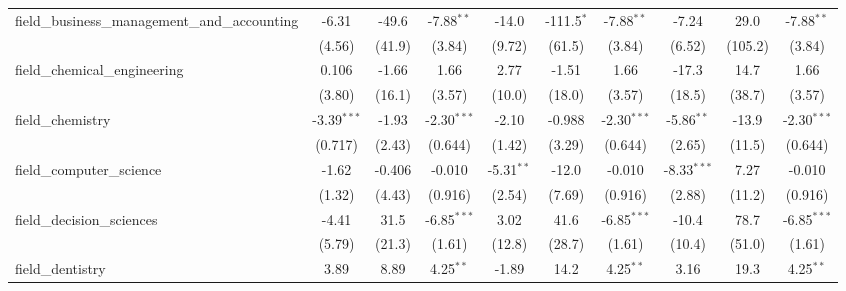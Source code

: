 \begin{tabular}{lccccccccc}
   field\_business\_management\_and\_accounting                & -6.31         & -49.6          & -7.88$^{**}$  & -14.0         & -111.5$^{*}$  & -7.88$^{**}$  & -7.24         & 29.0           & -7.88$^{**}$\\   
                                                               & (4.56)        & (41.9)         & (3.84)        & (9.72)        & (61.5)        & (3.84)        & (6.52)        & (105.2)        & (3.84)\\   
   field\_chemical\_engineering                                & 0.106         & -1.66          & 1.66          & 2.77          & -1.51         & 1.66          & -17.3         & 14.7           & 1.66\\   
                                                               & (3.80)        & (16.1)         & (3.57)        & (10.0)        & (18.0)        & (3.57)        & (18.5)        & (38.7)         & (3.57)\\   
   field\_chemistry                                            & -3.39$^{***}$ & -1.93          & -2.30$^{***}$ & -2.10         & -0.988        & -2.30$^{***}$ & -5.86$^{**}$  & -13.9          & -2.30$^{***}$\\   
                                                               & (0.717)       & (2.43)         & (0.644)       & (1.42)        & (3.29)        & (0.644)       & (2.65)        & (11.5)         & (0.644)\\   
   field\_computer\_science                                    & -1.62         & -0.406         & -0.010        & -5.31$^{**}$  & -12.0         & -0.010        & -8.33$^{***}$ & 7.27           & -0.010\\   
                                                               & (1.32)        & (4.43)         & (0.916)       & (2.54)        & (7.69)        & (0.916)       & (2.88)        & (11.2)         & (0.916)\\   
   field\_decision\_sciences                                   & -4.41         & 31.5           & -6.85$^{***}$ & 3.02          & 41.6          & -6.85$^{***}$ & -10.4         & 78.7           & -6.85$^{***}$\\   
                                                               & (5.79)        & (21.3)         & (1.61)        & (12.8)        & (28.7)        & (1.61)        & (10.4)        & (51.0)         & (1.61)\\   
   field\_dentistry                                            & 3.89          & 8.89           & 4.25$^{**}$   & -1.89         & 14.2          & 4.25$^{**}$   & 3.16          & 19.3           & 4.25$^{**}$\\   

\end{tabular}
